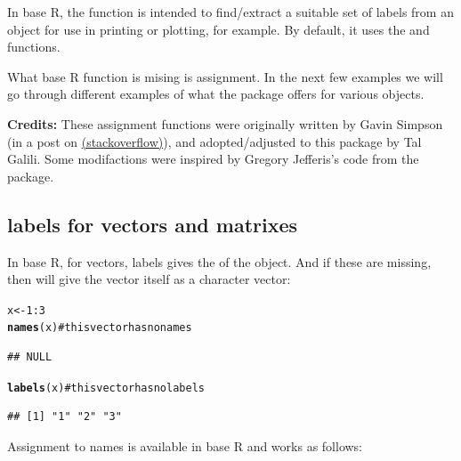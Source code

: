 \documentclass[shortnames,nojss,article]{jss}\usepackage{graphicx, color}
\makeatletter
\newcommand{\hlfunctioncall}[1]{\textcolor[rgb]{0.501960784313725,0,0.329411764705882}{\textbf{#1}}}%
\newcommand{\hlcomment}[1]{\textcolor[rgb]{0.180392156862745,0.6,0.341176470588235}{#1}}%
\newenvironment{kframe}{%
 \def\at@end@of@kframe{}%
 \ifinner\ifhmode%
  \def\at@end@of@kframe{\end{minipage}}%
  \begin{minipage}{\columnwidth}%
 \fi\fi%
 \def\FrameCommand##1{\hskip\@totalleftmargin \hskip-\fboxsep
 \colorbox{shadecolor}{##1}\hskip-\fboxsep
     \hskip-\linewidth \hskip-\@totalleftmargin \hskip\columnwidth}%
 \MakeFramed {\advance\hsize-\width
   \@totalleftmargin\z@ \linewidth\hsize
   \@setminipage}}%
 {\par\unskip\endMakeFramed%
 \at@end@of@kframe}
\newenvironment{knitrout}{}{} %
\makeatother
\begin{document}
In base R, the  function is intended to find/extract a suitable set of labels from an object for use in printing or plotting, for example. By default, it uses the  and  functions.

What base R  function is mising is assignment. In the next few examples we will go through different examples of what the  package offers for various objects.

\textbf{Credits:} These assignment functions were originally written by Gavin Simpson (in a post on \href{http://stackoverflow.com/questions/4614223/how-to-have-the-following-work-labelsx-some-value-r-question}{(stackoverflow)}), and adopted/adjusted to this package by Tal Galili. Some modifactions were inspired by Gregory Jefferis's code from the  package.


\subsection{labels for vectors and matrixes}

In base R, for vectors, labels gives the  of the object. And if these are missing, then  will give the vector itself as a character vector:

\begin{knitrout}
\color{fgcolor}\begin{kframe}
\begin{alltt}
x <- 1:3
\hlfunctioncall{names}(x)  \hlcomment{# this vector has no names}
\end{alltt}
\begin{verbatim}
## NULL
\end{verbatim}
\begin{alltt}
\hlfunctioncall{labels}(x)  \hlcomment{# this vector has no labels}
\end{alltt}
\begin{verbatim}
## [1] "1" "2" "3"
\end{verbatim}
\end{kframe}
\end{knitrout}


Assignment to names is available in base R and works as follows:
\end{document}
